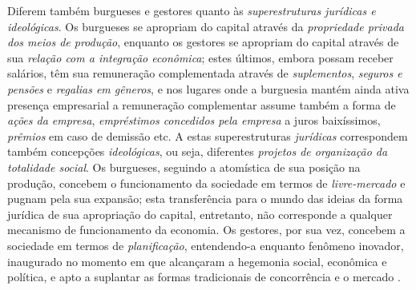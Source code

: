 Diferem também burgueses e gestores quanto às \textit{superestruturas jurídicas e ideológicas}. Os burgueses se apropriam do capital através da \textit{propriedade privada dos meios de produção}, enquanto os gestores se apropriam do capital através de sua \textit{relação com a integração econômica}; estes últimos, embora possam receber salários, têm sua remuneração complementada através de \textit{suplementos}, \textit{seguros e pensões} e \textit{regalias em gêneros}, e nos lugares onde a burguesia mantém ainda ativa presença empresarial a remuneração complementar assume também a forma de \textit{ações da empresa}, \textit{empréstimos concedidos pela empresa} a juros baixíssimos, \textit{prêmios} em caso de demissão etc. A estas superestruturas \textit{jurídicas} correspondem também concepções \textit{ideológicas}, ou seja, diferentes \textit{projetos de organização da totalidade social}. Os burgueses, seguindo a atomística de sua posição na produção, concebem o funcionamento da sociedade em termos de \textit{livre-mercado} e pugnam pela sua expansão; esta transferência para o mundo das ideias da forma jurídica de sua apropriação do capital, entretanto, não corresponde a qualquer mecanismo de funcionamento da economia. Os gestores, por sua vez, concebem a sociedade em termos de \textit{planificação}, entendendo-a enquanto fenômeno inovador, inaugurado no momento em que alcançaram a hegemonia social, econômica e política, e apto a suplantar as formas tradicionais de concorrência e o mercado \cite[p.~204-208]{BERNARDO1991}. 

